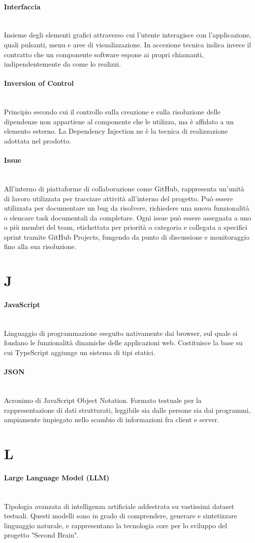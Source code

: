 \documentclass[a4paper, 10pt, colorlinks=true, linkcolor=black, urlcolor=blue, citecolor=blue, hidelinks]{article}
\newcommand{\glossaryterm}[2]{
    \paragraph{#1 \label{term:#1}} \mbox{} \\
    #2
    \vspace{0.5em}
}
\begin{document}
\glossaryterm{Interfaccia}{Insieme degli elementi grafici attraverso cui l'utente interagisce con l'applicazione, quali pulsanti, menu e aree di visualizzazione. In accezione tecnica indica invece il contratto che un componente software espone ai propri chiamanti, indipendentemente da come lo realizzi.}

\glossaryterm{Inversion of Control}{Principio secondo cui il controllo sulla creazione e sulla risoluzione delle dipendenze non appartiene al componente che le utilizza, ma è affidato a un elemento esterno. La Dependency Injection ne è la tecnica di realizzazione adottata nel prodotto.}

\glossaryterm{Issue}{All'interno di piattaforme di collaborazione come GitHub, rappresenta un'unità di lavoro utilizzata per tracciare attività all'interno del progetto. Può essere utilizzata per documentare un bug da risolvere, richiedere una nuova funzionalità o elencare task documentali da completare. Ogni issue può essere assegnata a uno o più membri del team, etichettata per priorità o categoria e collegata a specifici sprint tramite GitHub Projects, fungendo da punto di discussione e monitoraggio fino alla sua risoluzione.}

\newpage

\section*{J}

\glossaryterm{JavaScript}{Linguaggio di programmazione eseguito nativamente dai browser, sul quale si fondano le funzionalità dinamiche delle applicazioni web. Costituisce la base su cui TypeScript aggiunge un sistema di tipi statici.}

\glossaryterm{JSON}{Acronimo di JavaScript Object Notation. Formato testuale per la rappresentazione di dati strutturati, leggibile sia dalle persone sia dai programmi, ampiamente impiegato nello scambio di informazioni fra client e server.}

\newpage

\section*{L}

\glossaryterm{Large Language Model (LLM)}{Tipologia avanzata di intelligenza artificiale addestrata su vastissimi dataset testuali. Questi modelli sono in grado di comprendere, generare e sintetizzare linguaggio naturale, e rappresentano la tecnologia core per lo sviluppo del progetto "Second Brain".}
\end{document}
